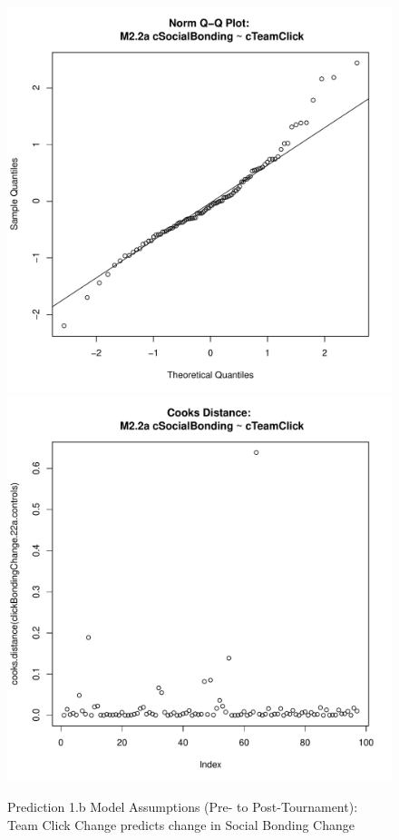 \begin{CJK}{UTF8}{gbsn}
\begin{figure}[htbp]
        \includegraphics[scale =.4]{images/MLM22aQQNorm.pdf}
        \includegraphics[scale =.4]{images/MLM22aCooksD.pdf}
        \caption{Prediction 1.b Model Assumptions (Pre- to Post-Tournament): Team Click Change predicts change in Social Bonding Change}
        \label{fig:MLM22aAssumptions}
      \end{figure}






\end{CJK}
